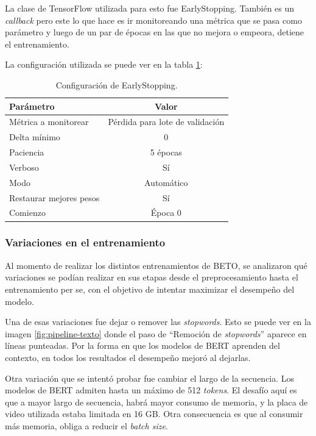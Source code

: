La clase de TensorFlow utilizada para esto fue EarlyStopping. También es un \textit{callback} pero este lo que hace es ir monitoreando una métrica que se pasa como parámetro y luego de un par de épocas en las que no mejora o empeora, detiene el entrenamiento.

La configuración utilizada se puede ver en la tabla \ref{tab:earlystopping}:
\begin{table}[H]
	\centering
	\caption[Configuración EarlyStopping]{Configuración de EarlyStopping.}
	\begin{tabular}{l c}    
		\toprule
		\textbf{Parámetro}			& 			\textbf{Valor}  \\
		\midrule
		Métrica a monitorear		& 			Pérdida para lote de validación  \\
		Delta mínimo				& 			0 \\
		Paciencia					& 			5 épocas  \\
		Verboso						& 			Sí  \\
		Modo						& 			Automático  \\	
		Restaurar mejores pesos 	& 			Sí  \\
		Comienzo					& 			Época 0  \\	
		\bottomrule
		\hline
	\end{tabular}
	\label{tab:earlystopping}
\end{table}

\subsubsection{Variaciones en el entrenamiento}

Al momento de realizar los distintos entrenamientos de BETO, se analizaron qué variaciones se podían realizar en sus etapas desde el preprocesamiento hasta el entrenamiento per se, con el objetivo de intentar maximizar el desempeño del modelo. 

Una de esas variaciones fue dejar o remover las \textit{stopwords}. Esto se puede ver en la imagen \ref{fig:pipeline-texto} donde el paso de ``Remoción de \textit{stopwords}'' aparece en líneas punteadas. Por la forma en que los modelos de BERT aprenden del contexto, en todos los resultados el desempeño mejoró al dejarlas.

Otra variación que se intentó probar fue cambiar el largo de la secuencia. Los modelos de BERT admiten hasta un máximo de 512 \textit{tokens}. El desafío aquí es que a mayor largo de secuencia, habrá mayor consumo de memoria, y la placa de video utilizada estaba limitada en 16 GB. Otra consecuencia es que al consumir más memoria, obliga a reducir el \textit{batch size}.

